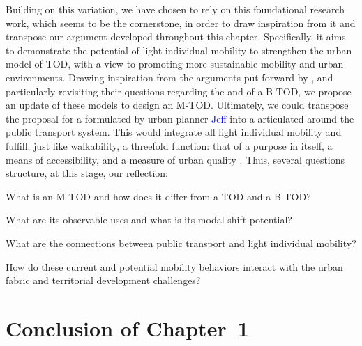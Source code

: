 \begin{refsegment}
Building on this variation, we have chosen to rely on this foundational research work, which seems to be the cornerstone, in order to draw inspiration from it and transpose our argument developed throughout this chapter. Specifically, it aims to demonstrate the potential of light individual mobility to strengthen the urban model of \acrshort{TOD}, with a view to promoting more sustainable mobility and urban environments. Drawing inspiration from the arguments put forward by \textcolor{blue}{\textcite{lee_bicycle-based_2016}}, and particularly revisiting their questions regarding the  and  of a \acrshort{B-TOD}, we propose an update of these models to design an \acrfull{M-TOD}. Ultimately, we could transpose the proposal for a  formulated by urban planner \textcolor{blue}{Jeff} \textcolor{blue}{\textcite[73]{speck_walkable_2013}} into a  articulated around the public transport system. This would integrate all light individual mobility and fulfill, just like walkability, a threefold function: that of a purpose in itself, a means of accessibility, and a measure of urban quality \textcolor{blue}{\autocite[73]{speck_walkable_2013}}. Thus, several questions structure, at this stage, our reflection:
\begin{customitemize}
\item What is an \acrshort{M-TOD} and how does it differ from a \acrshort{TOD} and a \acrshort{B-TOD}?
\item What are its observable uses and what is its modal shift potential?
\item What are the connections between public transport and light individual mobility?
\item How do these current and potential mobility behaviors interact with the urban fabric and territorial development challenges?
\end{customitemize}%

\newpage
{} %
\section*{Conclusion of Chapter~1
    \label{chap1:conclusion}
    }


\end{refsegment}
